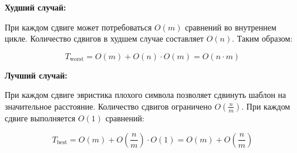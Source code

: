 \documentclass[otchet]{SCWorks}
\begin{document}
\textbf{Худший случай:}

При каждом сдвиге может потребоваться $O(m)$ сравнений во внутреннем цикле. Количество сдвигов в худшем случае составляет $O(n)$. Таким образом:

$$
T_{\text{worst}} = O(m) + O(n) \cdot O(m) = O(n \cdot m)
$$

\textbf{Лучший случай:}

При каждом сдвиге эвристика плохого символа позволяет сдвинуть шаблон на значительное расстояние. Количество сдвигов ограничено $O\left(\frac{n}{m}\right)$. При каждом сдвиге выполняется $O(1)$ сравнений:

$$
T_{\text{best}} = O(m) + O\left(\frac{n}{m}\right) \cdot O(1) = O(m) + O\left(\frac{n}{m}\right)
$$
\end{document}
